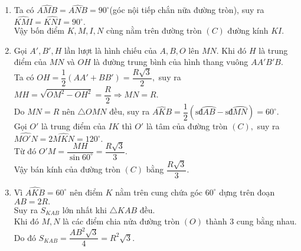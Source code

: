 \begin{ex}
{\begin{center}
		\end{center}
	\begin{enumerate}
		\item Ta có $ \widehat{AMB}=\widehat{ANB}=90^{\circ} $(góc nội tiếp chắn nữa đường tròn), suy ra $ \widehat{KMI}=\widehat{KNI}=90^{\circ}.$\\
		Vậy bốn điểm $ K,M,I,N $ cùng nằm trên đường tròn $ (C) $ đường kính $ KI. $
		\item Gọi $ A',B',H $ lần lượt là hình chiếu của $ A,B,O $ lên $ MN. $ Khi đó $ H $ là trung điểm của $ MN $ và $ OH $ là đường trung bình của hình thang vuông $ AA'B'B. $\\
		Ta có $ OH =\dfrac{1}{2}(AA'+BB')=\dfrac{R\sqrt{3}}{2}, $ suy ra\\
		$ MH = \sqrt{OM^2-OH^2}=\dfrac{R}{2} \Rightarrow MN =R.$\\
		Do $ MN=R $ nên $ \triangle OMN $ đều, suy ra $ \widehat{AKB}=\dfrac{1}{2}(\text{sđ}\wideparen{AB}-\text{sđ}\wideparen{MN})=60^{\circ}. $\\
		Gọi $ O' $ là trung điểm của $ IK $ thì $ O' $ là tâm của đường tròn $ (C), $ suy ra \\
		$ \widehat{MO'N}=2\widehat{MKN}=120^{\circ}. $\\
		Từ đó $ O'M =\dfrac{MH}{\sin 60^{\circ}}=\dfrac{R\sqrt{3}}{3}.$\\
		Vậy bán kính của đường tròn $ (C) $ bằng $ \dfrac{R\sqrt{3}}{3}. $
		\item Vì $ \widehat{AKB}=60^{\circ} $ nên điểm $ K $ nằm trên cung chứa góc $ 60^{\circ} $ dựng trên đoạn $ AB=2R. $\\
		Suy ra $S_{KAB} $ lớn nhất khi $ \triangle KAB $ đều.\\
		Khi đó $ M,N $ là các điểm chia nửa đường tròn $ (O) $ thành $ 3 $ cung bằng nhau. \\
		Do đó $ S_{KAB}=\dfrac{AB^2\sqrt{3}}{4}=R^2\sqrt{3}. $
	\end{enumerate}
	}
	\end{ex}

